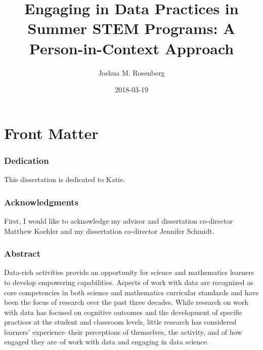\documentclass[]{book}
\title{Engaging in Data Practices in Summer STEM Programs: A Person-in-Context
Approach}
\author{Joshua M. Rosenberg}
\date{2018-03-19}
\theoremstyle{definition}
\theoremstyle{definition}
\theoremstyle{definition}
\theoremstyle{remark}
\begin{document}
\maketitle

{
\setcounter{tocdepth}{1}
\tableofcontents
}
\chapter{Front Matter}\label{front-matter}

\subsection{Dedication}\label{dedication}

This dissertation is dedicated to Katie.

\subsection{Acknowledgments}\label{acknowledgments}

First, I would like to acknowledge my advisor and dissertation
co-director Matthew Koehler and my dissertation co-director Jennifer
Schmidt.

\subsection{Abstract}\label{abstract}

Data-rich activities provide an opportunity for science and mathematics
learners to develop empowering capabilities. Aspects of work with data
are recognized as core competencies in both science and mathematics
curricular standards and have been the focus of research over the past
three decades. While research on work with data has focused on cognitive
outcomes and the development of specific practices at the student and
classroom levels, little research has considered learners'
experience--their perceptions of themselves, the activity, and of how
engaged they are--of work with data and engaging in data science.
\end{document}
